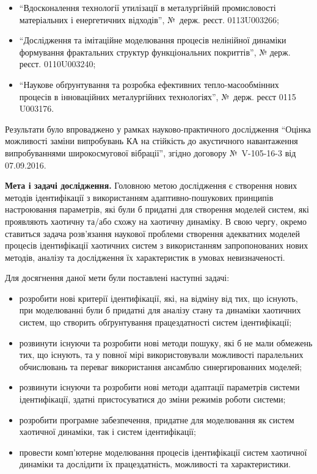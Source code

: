 \documentclass[a4paper,12pt]{atuaref}
\begin{document}
\begin{itemize}


\item
  ``Вдосконалення технології утилізації в металургійній промисловості
  матеріальних і енергетичних відходів'', №~держ. реєст. 0113U003266;

  \item
  ``Дослідження та імітаційне моделювання процесів нелінійної динаміки
  формування фрактальних структур функціональних   покриттів'',
  № держ. реєст. 0110U003240;

  \item
  ``Наукове обґрунтування та розробка ефективних тепло-масообмінних
  процесів в інноваційних металургійних технологіях'', №~держ. реєст 0115 U003176.

\end{itemize}

Результати було впроваджено у рамках науково-практичного дослідження
``Оцінка    можливості заміни випробувань КА на стійкість до акустичного навантаження
випробуваннями широкосмугової вібрації'', згідно договору №~V-105-16-3 від 07.09.2016.

\textbf{Мета і задачі дослідження.}
Головною метою дослідження є створення нових методів ідентифікації з
використанням адаптивно-пошукових принципів настроювання параметрів, які
були б придатні для створення моделей систем, які проявляють хаотичну
та/або схожу на хаотичну динаміку. В свою чергу, окремо ставиться задача
розв'язання наукової проблеми створення адекватних моделей процесів
ідентифікації хаотичних систем з використанням запропонованих нових
методів, аналізу та дослідження їх характеристик в умовах невизначеності.

Для досягнення даної мети були поставлені наступні задачі:

\begin{itemize}

  \item
  розробити нові критерії ідентифікації, які, на відміну від тих, що
  існують, при моделюванні були б придатні для аналізу стану та динаміки
  хаотичних систем, що створить обґрунтування працездатності систем
  ідентифікації;

  \item
  розвинути існуючи та розробити нові методи пошуку, які б не мали
  обмежень тих, що існують, та у повної мірі використовували можливості
  паралельних обчислювань та переваг використання ансамблю
  синергированних моделей;

  \item
  розвинути існуючи та розробити нові методи адаптації параметрів
  системи ідентифікації, здатні пристосуватися до зміни режимів роботи
  системи;

  \item
  розробити програмне забезпечення, придатне для моделювання як систем
  хаотичної динаміки, так і систем ідентифікації;

  \item
  провести комп'ютерне моделювання процесів ідентифікації систем
  хаотичної динаміки та дослідити їх працездатність, можливості та
  характеристики.

\end{itemize}
\end{document}
